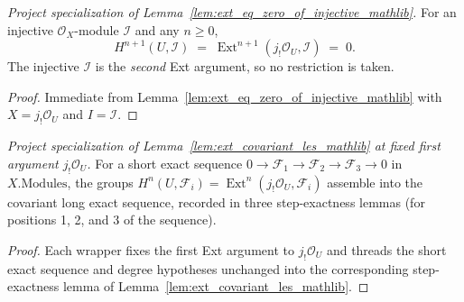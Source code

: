 \begin{lemma}

  \label{lem:absolute_cohomology_injective_vanishing}
  \textit{Project specialization of Lemma~\ref{lem:ext_eq_zero_of_injective_mathlib}.}
  For an injective \(\mathcal{O}_X\)-module \(\mathcal{I}\) and any \(n \geq 0\),
  \[
    H^{n+1}(U, \mathcal{I}) \;=\; \operatorname{Ext}^{n+1}(j_!\mathcal{O}_U, \mathcal{I}) \;=\; 0.
  \]
  The injective \(\mathcal{I}\) is the \emph{second} Ext argument, so no restriction is taken.
\end{lemma}
\begin{proof}
  \leanok
  Immediate from Lemma~\ref{lem:ext_eq_zero_of_injective_mathlib} with \(X = j_!\mathcal{O}_U\) and
  \(I = \mathcal{I}\).
\end{proof}

\begin{lemma}
  \label{lem:absolute_cohomology_covariant_les}
  \textit{Project specialization of Lemma~\ref{lem:ext_covariant_les_mathlib} at fixed first
  argument \(j_!\mathcal{O}_U\).}
  For a short exact sequence \(0 \to \mathcal{F}_1 \to \mathcal{F}_2 \to \mathcal{F}_3 \to 0\) in
  \(X.\mathrm{Modules}\), the groups \(H^n(U, \mathcal{F}_i) = \operatorname{Ext}^n(j_!
  \mathcal{O}_U, \mathcal{F}_i)\) assemble into the covariant long exact sequence, recorded in
  three step-exactness lemmas (for positions 1, 2, and 3 of the sequence).
\end{lemma}
\begin{proof}
  Each wrapper fixes the first Ext argument to \(j_!\mathcal{O}_U\) and threads the short exact
  sequence and degree hypotheses unchanged into the corresponding step-exactness lemma of
  Lemma~\ref{lem:ext_covariant_les_mathlib}.
\end{proof}

